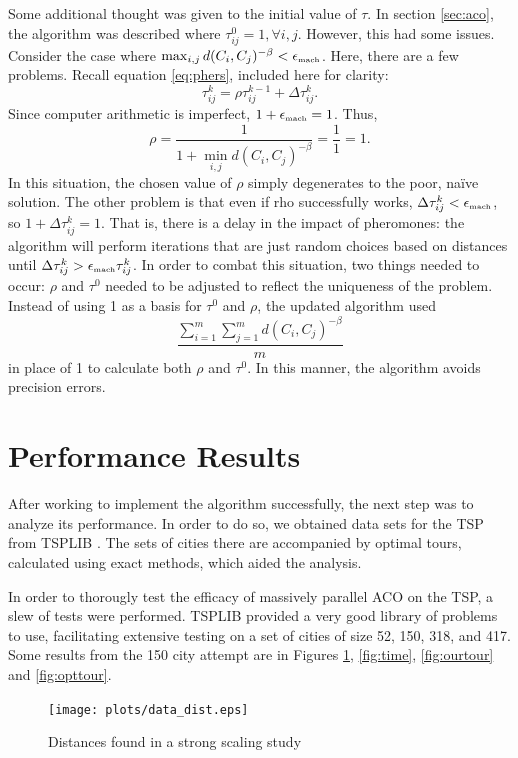 \documentclass[twocolumn]{article}
\begin{document}
Some additional thought was given to the initial value of $\tau$. In section \ref{sec:aco},
the algorithm was described where $\tau^0_{ij} = 1,\forall i,j$. However,
this had some issues. Consider the case where $\max_{i,j} d(C_i,C_j)^{-\beta} < 
\epsilon_{\mbox{{\tiny mach}}}$. Here,
there are a few problems. Recall equation \eqref{eq:phers}, included here for clarity:
\[ \tau^k_{ij} = \rho \tau^{k-1}_{ij} + \Delta \tau^k_{ij}. \]
Since computer arithmetic is imperfect, $1 + \epsilon_{\mbox{{\tiny mach}}} = 1$. Thus, 
\[\rho = \frac{1}{1+\min_{i,j} d(C_i,C_j)^{-\beta}} = \frac{1}{1} = 1. \]
In this situation, the chosen value of $\rho$ simply degenerates to the poor, 
na\"{i}ve solution. The other problem is that even if rho successfully works, 
$\Delta \tau^k_{ij} < \epsilon_{\mbox{{\tiny mach}}}$, so $1 + \Delta \tau^k_{ij} = 1$. That is,
there is a delay in the impact of pheromones: the algorithm will perform iterations that 
are just random choices based on distances until 
$\Delta \tau^k_{ij} > \epsilon_{\mbox{{\tiny mach}}}\tau^k_{ij}$. In order to combat this situation,
two things needed to occur: $\rho$ and $\tau^0$ needed to be adjusted to reflect the uniqueness
of the problem. Instead of using 1 as a basis for $\tau^0$ and $\rho$, the updated algorithm
used 
\[ \frac{\sum_{i=1}^m \sum_{j=1}^m d(C_i,C_j)^{-\beta}}{m} \]
in place of 1 to calculate both $\rho$ and $\tau^0$. In this manner, the algorithm 
avoids precision errors.

\section{Performance Results}

After working to implement the algorithm successfully, the next step was to
analyze its performance. In order to do so, we obtained data sets
for the TSP from TSPLIB \cite{tsplib}. The sets of cities
there are accompanied by optimal tours, calculated using exact methods, which
aided the analysis. 

In order to thorougly test the efficacy of massively parallel ACO on the TSP,
a slew of tests were performed. TSPLIB provided a very good library of problems
to use, facilitating extensive testing on a set of cities of size 52, 150,
318, and 417. Some results from the 150 city attempt are in Figures \ref{fig:dist},
\ref {fig:time}, \ref{fig:ourtour} and \ref{fig:opttour}. 

\begin{figure}
  \centering
  \texttt{[image: plots/data\_dist.eps]}
  \caption{Distances found in a strong scaling study} \label{fig:dist}
\end{figure}
\end{document}

